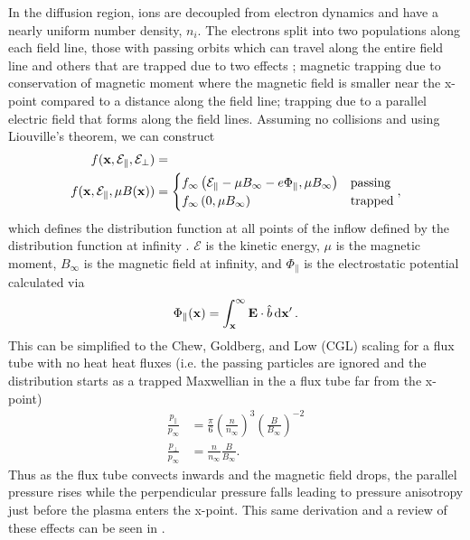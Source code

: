 In the diffusion region, ions are decoupled from electron dynamics and have a nearly uniform number density, $n_i$. The electrons split into two populations along each field line, those with passing orbits which can travel along the entire field line and others that are trapped due to two effects \cite{Le_Egedal_Fox_Katz_Vrublevskis_Daughton_Drake_2010}; magnetic trapping due to conservation of magnetic moment where the magnetic field is smaller near the x-point compared to a distance along the field line; trapping due to a parallel electric field that forms along the field lines. %
Assuming no collisions and using Liouville's theorem, we can construct
\begin{align}
  f(\vb{x}, \mathcal{E}_\parallel, \mathcal{E}_\perp) &= \\
  f(\vb{x}, \mathcal{E}_\parallel, \mu B(\vb{x})) &= \begin{cases}
    f_\infty\left(\mathcal{E}_\parallel - \mu B_\infty - e \Phi_\parallel, \mu B_\infty \right) & \text{passing} \\
    f_\infty\left(0, \mu B_\infty \right) & \text{trapped} \\
  \end{cases},
\end{align}
which defines the distribution function at all points of the inflow defined by the distribution function at infinity \cite{Le_Egedal_Daughton_Fox_Katz_2009}. $\mathcal{E}$ is the kinetic energy, $\mu$ is the magnetic moment, $B_\infty$ is the magnetic field at infinity, and $\Phi_\parallel$ is the electrostatic potential calculated via
\begin{equation}
  \Phi_\parallel(\vb{x}) = \int_{\vb{x}}^\infty \vb{E} \cdot \hat{b} \dd{\vb{x}'}.
\end{equation}
This can be simplified to the Chew, Goldberg, and Low (CGL) scaling for a flux tube with no heat heat fluxes (i.e. the passing particles are ignored and the distribution starts as a trapped Maxwellian in the a flux tube far from the x-point) \cite{Chew_Goldberger_Low_1956}
\begin{align}
  \frac{p_\parallel}{ p_\infty} &= \frac{\pi}{6} \left(\frac{n}{n_\infty}\right)^3 \left(\frac{B}{B_\infty}\right)^{-2} \label{eq:cgl_parallel} \\
  \frac{p_\perp}{ p_\infty} &= \frac{n}{n_\infty} \frac{B}{B_\infty}. \label{eq:cgl_perp}
\end{align}
Thus as the flux tube convects inwards and the magnetic field drops, the parallel pressure rises while the perpendicular pressure falls leading to pressure anisotropy just before the plasma enters the x-point. This same derivation and a review of these effects can be seen in \cite{Egedal_Le_Daughton_2013}.

